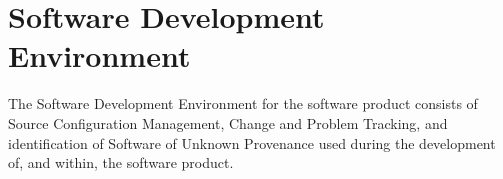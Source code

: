 \section{Software Development Environment}
The Software Development Environment for the software product consists of Source Configuration Management, Change and Problem Tracking, and identification of Software of Unknown Provenance used during the development of, and within, the software product.
